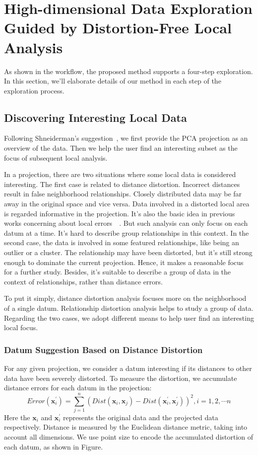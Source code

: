 \section{High-dimensional Data Exploration Guided by Distortion-Free Local Analysis}
As shown in the workflow, the proposed method supports a four-step exploration. In this section, we'll elaborate details of our method in each step of the exploration process.
\label{section:method}
\subsection{Discovering Interesting Local Data}
Following Shneiderman's suggestion~\cite{DBLP:conf/vl/Shneiderman96}, we first provide the PCA projection as an overview of the data. Then we help the user find an interesting subset as the focus of subsequent local analysis.

In a projection, there are two situations where some local data is considered interesting. The first case is related to distance distortion. Incorrect distances result in false neighborhood relationships. Closely distributed data may be far away in the original space and vice versa. Data involved in a distorted local area is regarded informative in the projection. It's also the basic idea in previous works concerning about local errors~\cite{DBLP:journals/cg/MartinsCMT14}~\cite{DBLP:journals/tvcg/StahnkeDMT16}. But such analysis can only focus on each datum at a time. It's hard to describe group relationships in this context. In the second case, the data is involved in some featured relationships, like being an outlier or a cluster. The relationship may have been distorted, but it's still strong enough to dominate the current projection. Hence, it makes a reasonable focus for a further study. Besides, it's suitable to describe a group of data in the context of relationships, rather than distance errors.

To put it simply, distance distortion analysis focuses more on the neighborhood of a single datum. Relationship distortion analysis helps to study a group of data. Regarding the two cases, we adopt different means to help user find an interesting local focus.

\subsubsection{Datum Suggestion Based on Distance Distortion}
For any given projection, we consider a datum interesting if its distances to other data have been severely distorted. To measure the distortion, we accumulate distance errors for each datum in the projection:
$$Error(\mathbf{x}_{i}^{\prime}) = \sum\limits_{j=1}^{n}(Dist(\mathbf{x}_{i}, \mathbf{x}_{j}) - Dist(\mathbf{x}_{i}^{\prime}, \mathbf{x}_{j}^{\prime}))^{2}, i = 1,2,\cdots n$$
Here the $\mathbf{x}_{i}$ and $\mathbf{x}_{i}^{\prime}$ represents the original data and the projected data respectively. Distance is measured by the Euclidean distance metric, taking into account all dimensions. We use point size to encode the accumulated distortion of each datum, as shown in Figure. 

